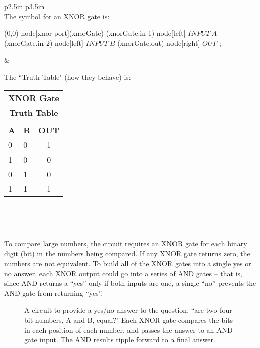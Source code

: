 \medskip
\begin{center}

\begin{tabular}{p{2.5in} p{3.5in} }
\hline\\[\negsep]

The symbol for an XNOR gate is:

\vspace{0.25in}

\begin{circuitikz}
\draw
	(0,0) node[xnor port](xnorGate) {}
	(xnorGate.in 1) node[left] {{\color{red}$INPUT~A$}}
	(xnorGate.in 2) node[left] {{\color{red}$INPUT~B$}}
	(xnorGate.out) node[right] {{\color{red}$OUT$}}
;
\end{circuitikz}

&

\centering

The ``Truth Table" (how they behave) is: 
\vspace{0.15in}

\begin{tabular}{ll | c}
\multicolumn{3}{c}{\textbf{XNOR Gate }}\\
\multicolumn{3}{c}{\textbf{Truth Table}}\\
\hline\\[\negsep]
\textbf{A} & \textbf{B} & \textbf{OUT}\\
\hline
0 & 0 & 1  \\
1 & 0 & 0  \\
0 & 1 & 0  \\
1 & 1 & 1  \\
\hline
\end{tabular}
\\
\tabularnewline

\hline\\[\negsep]

\end{tabular}
\end{center}

\bigskip

To compare large numbers, the circuit requires an XNOR gate for each binary digit (bit) in the numbers being compared. If any XNOR gate returns zero, the numbers are not equivalent. To build all of the XNOR gates into a single yes or no answer, each XNOR output could go into a series of AND gates -- that is, since AND returns a ``yes'' only if both inputs are one, a single ``no'' prevents the AND gate from returning ``yes''. 


\begin{figure}[h!]
\begin{center}

\caption{A circuit to provide a yes/no answer to the question, ``are  two four-bit numbers, A and B, equal?" Each XNOR gate compares the bits in each position of each number, and passes the answer to an AND gate input. The AND results ripple forward to a final answer.}
\end{center}
\end{figure}

